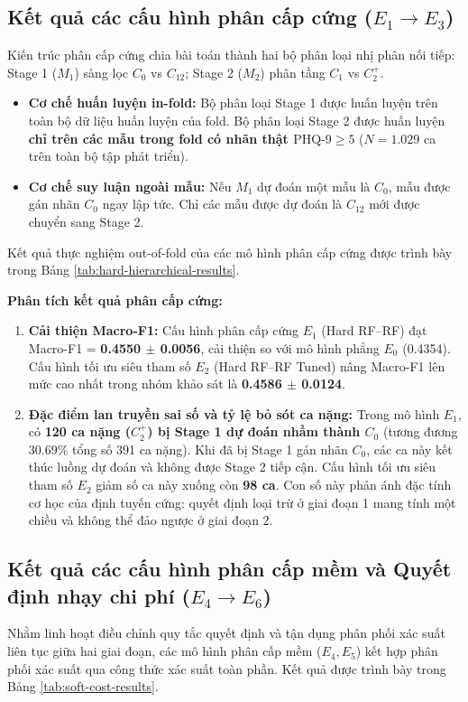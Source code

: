 \subsection{Kết quả các cấu hình phân cấp cứng ($E_1 \to E_3$)}
Kiến trúc phân cấp cứng chia bài toán thành hai bộ phân loại nhị phân nối tiếp: Stage 1 ($M_1$) sàng lọc $C_0$ vs $C_{12}$; Stage 2 ($M_2$) phân tầng $C_1$ vs $C_2^+$.
\begin{itemize}
    \item \textbf{Cơ chế huấn luyện in-fold:} Bộ phân loại Stage 1 được huấn luyện trên toàn bộ dữ liệu huấn luyện của fold. Bộ phân loại Stage 2 được huấn luyện \textbf{chỉ trên các mẫu trong fold có nhãn thật $\text{PHQ-9} \ge 5$} ($N = 1.029$ ca trên toàn bộ tập phát triển).
    \item \textbf{Cơ chế suy luận ngoài mẫu:} Nếu $M_1$ dự đoán một mẫu là $C_0$, mẫu được gán nhãn $C_0$ ngay lập tức. Chỉ các mẫu được dự đoán là $C_{12}$ mới được chuyển sang Stage 2.
\end{itemize}

Kết quả thực nghiệm out-of-fold của các mô hình phân cấp cứng được trình bày trong Bảng \ref{tab:hard-hierarchical-results}.



\textbf{Phân tích kết quả phân cấp cứng:}
\begin{enumerate}
    \item \textbf{Cải thiện Macro-F1:} Cấu hình phân cấp cứng $E_1$ (Hard RF--RF) đạt Macro-F1 = \textbf{0.4550 $\pm$ 0.0056}, cải thiện so với mô hình phẳng $E_0$ (0.4354). Cấu hình tối ưu siêu tham số $E_2$ (Hard RF--RF Tuned) nâng Macro-F1 lên mức cao nhất trong nhóm khảo sát là \textbf{0.4586 $\pm$ 0.0124}.
    \item \textbf{Đặc điểm lan truyền sai số và tỷ lệ bỏ sót ca nặng:} Trong mô hình $E_1$, có \textbf{120 ca nặng ($C_2^+$) bị Stage 1 dự đoán nhầm thành $C_0$} (tương đương 30.69\% tổng số 391 ca nặng). Khi đã bị Stage 1 gán nhãn $C_0$, các ca này kết thúc luồng dự đoán và không được Stage 2 tiếp cận. Cấu hình tối ưu siêu tham số $E_2$ giảm số ca này xuống còn \textbf{98 ca}. Con số này phản ánh đặc tính cơ học của định tuyến cứng: quyết định loại trừ ở giai đoạn 1 mang tính một chiều và không thể đảo ngược ở giai đoạn 2.
\end{enumerate}

\subsection{Kết quả các cấu hình phân cấp mềm và Quyết định nhạy chi phí ($E_4 \to E_6$)}
Nhằm linh hoạt điều chỉnh quy tắc quyết định và tận dụng phân phối xác suất liên tục giữa hai giai đoạn, các mô hình phân cấp mềm ($E_4, E_5$) kết hợp phân phối xác suất qua công thức xác suất toàn phần. Kết quả được trình bày trong Bảng \ref{tab:soft-cost-results}.

